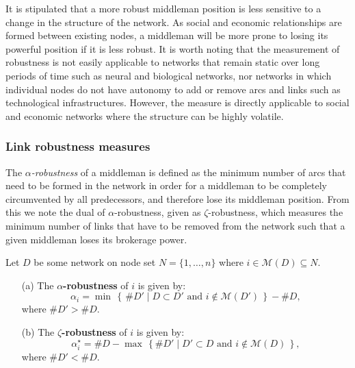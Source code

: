 It is stipulated that a more robust middleman position is less sensitive to a change in the structure of the network. As social and economic relationships are formed between existing nodes, a middleman will be more prone to losing its powerful position if it is less robust. It is worth noting that the measurement of robustness is not easily applicable to networks that remain static over long periods of time such as neural and biological networks, nor networks in which individual nodes do not have autonomy to add or remove arcs and links such as technological infrastructures. However, the measure is directly applicable to social and economic networks where the structure can be highly volatile.

\subsubsection{Link robustness measures}

The \emph{$\alpha$-robustness} of a middleman is defined as the minimum number of arcs that need to be formed in the network in order for a middleman to be completely circumvented by all predecessors, and therefore lose its middleman position. From this we note the dual of $\alpha$-robustness, given as $\zeta$-robustness, which measures the minimum number of links that have to be removed from the network such that a given middleman loses its brokerage power.

\begin{definition} \label{robustness}
Let $D$ be some network on node set $N = \{1,\ldots,n\}$ where $i \in \mathcal{M}(D) \subseteq N$. 
\begin{itemize}
	\item[(a)] The \textbf{$\alpha$-robustness} of $i$ is given by:
	\begin{equation} 
	\alpha_{i} = \min \, \left\{ \, \# D' \mid D \subset D' \mbox{ and } i \notin \mathcal{M}(D') \, \right\} - \# D , 
	\end{equation}
	where $\# D' > \# D$.

	\item[(b)] The \textbf{$\zeta$-robustness} of $i$ is given by:
	\begin{equation} 
	\alpha_{i}^{\star} = \# D - \max \, \left\{ \# D' \mid D' \subset D \mbox{ and } i \notin \mathcal{M}(D) \, \right\} , 
	\end{equation} 
	where $\# D' < \# D$.
\end{itemize}
\end{definition}

